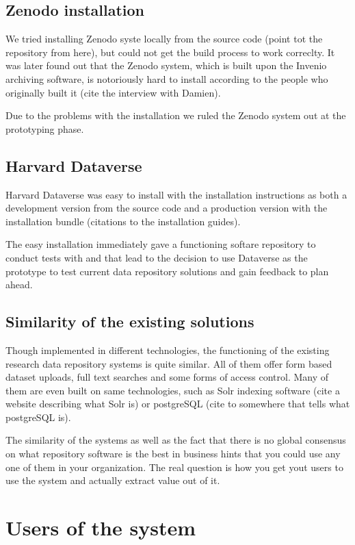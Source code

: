 \subsection{Zenodo installation}

We tried installing Zenodo syste locally from the source code (point tot the
repository from here), but could not get the build process to work correclty.
It was later found out that the Zenodo system, which is built upon the Invenio
archiving software, is notoriously hard to install according to the people who
originally built it (cite the interview with Damien).

Due to the problems with the installation we ruled the Zenodo system out at
the prototyping phase.

\subsection{Harvard Dataverse}

Harvard Dataverse was easy to install with the installation instructions as
both a development version from the source code and a production version with
the installation bundle (citations to the installation guides).

The easy installation immediately gave a functioning softare repository to
conduct tests with and that lead to the decision to use Dataverse as the
prototype to test current data repository solutions and gain feedback to plan
ahead.

\subsection{Similarity of the existing solutions}

Though implemented in different technologies, the functioning of the existing
research data repository systems is quite similar. All of them offer form based
dataset uploads, full text searches and some forms of access control. Many of
them are even built on same technologies, such as Solr indexing software (cite
a website describing what Solr is) or postgreSQL (cite to somewhere that tells
what postgreSQL is).

The similarity of the systems as well as the fact that there is no global
consensus on what repository software is the best in business hints that you
could use any one of them in your organization. The real question is how you
get yout users to use the system and actually extract value out of it.

\section{Users of the system}
\label{sec:users}

